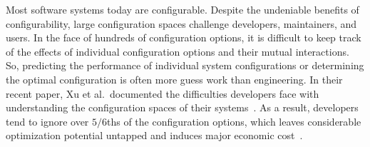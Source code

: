 Most software systems today are configurable. Despite the undeniable benefits
of configurability, 
large configuration spaces challenge developers, maintainers, and users. In the face of hundreds of configuration options, it is difficult to keep track of the effects of individual configuration options and their mutual interactions. So, predicting the performance of individual system configurations or determining the optimal configuration is often more guess work than engineering. In their recent paper, Xu et al.\ documented the  difficulties developers face
with understanding  the configuration spaces of their systems~\cite{xu2015hey}. As a result, developers tend to ignore over $5/6$ths of the configuration options, which leaves considerable optimization potential untapped and induces major economic cost~\cite{xu2015hey}.

